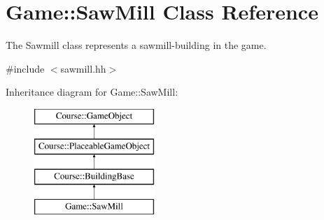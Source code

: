 \hypertarget{classGame_1_1SawMill}{\section{Game\-:\-:Saw\-Mill Class Reference}
\label{classGame_1_1SawMill}
}


The Sawmill class represents a sawmill-\/building in the game.  




{\ttfamily \#include $<$sawmill.\-hh$>$}

Inheritance diagram for Game\-:\-:Saw\-Mill\-:\begin{figure}[H]
\begin{center}
\leavevmode
\includegraphics[height=4.000000cm]{classGame_1_1SawMill}
\end{center}
\end{figure}
